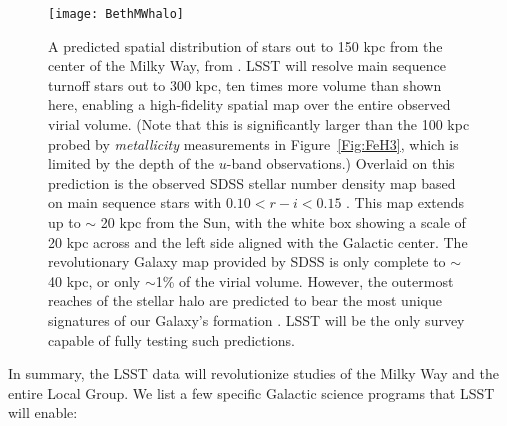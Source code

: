 \begin{figure}
\texttt{[image: BethMWhalo]}
\caption{A predicted spatial distribution of stars out to 150 kpc from the center of the Milky Way,
from \citet{2005ApJ...635..931B}.  LSST will resolve main sequence turnoff stars out to 300 kpc, ten times
more volume than shown here, enabling a high-fidelity spatial map over
the entire observed virial volume. (Note that this is significantly larger than the
100 kpc probed by {\em metallicity} measurements in
Figure~\ref{Fig:FeH3}, which is limited by the depth of the $u$-band observations.)
Overlaid on this prediction is the observed SDSS stellar number density map based on main sequence stars
with $0.10 < r-i < 0.15$ \citep{2008ApJ...673..864J}.  This map extends up to $\sim$ 20 kpc from the Sun, with
the white box showing a scale of 20 kpc across and the left side aligned with the Galactic center.
The revolutionary Galaxy map provided by SDSS is only complete to $\sim$40 kpc, or only $\sim$1\% of
the virial volume.  However, the outermost reaches of the stellar halo are predicted to bear the most unique
signatures of our Galaxy's formation \citep{2008ApJ...689..936J,2010MNRAS.406..744C}.   LSST will be the only survey
capable of fully testing such predictions.}
\label{Fig:halo}
\end{figure}



In summary, the LSST data will revolutionize studies of the Milky Way and the entire Local Group. We list a few specific
Galactic science programs that LSST will enable:

